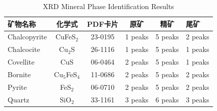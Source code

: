 \begin{table}[htbp]
\centering
\caption{XRD Mineral Phase Identification Results}
\label{tab:xrd_minerals}
\begin{tabular}{lccccl}
\toprule
矿物名称 & 化学式 & PDF卡片 & 原矿 & 精矿 & 尾矿 \\
\midrule
Chalcopyrite & CuFeS$_2$ & 23-0195 & 1 peaks & 5 peaks & 2 peaks \\
Chalcocite & Cu$_2$S & 26-1116 & 1 peaks & 5 peaks & 1 peaks \\
Covellite & CuS & 06-0464 & 2 peaks & 5 peaks & 1 peaks \\
Bornite & Cu$_5$FeS$_4$ & 11-0686 & 2 peaks & 5 peaks & 2 peaks \\
Pyrite & FeS$_2$ & 06-0710 & 2 peaks & 5 peaks & 2 peaks \\
Quartz & SiO$_2$ & 33-1161 & 3 peaks & 6 peaks & 3 peaks \\
\bottomrule
\end{tabular}
\end{table}